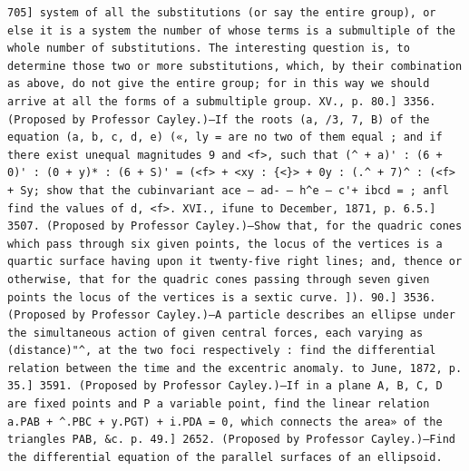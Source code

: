 \documentclass[11pt,a4paper]{book}
\begin{document}
\newpage
\setcounter{page}{575}
\begin{verbatim}
705] system of all the substitutions (or say the entire group), or else it is a system the number of whose terms is a submultiple of the whole number of substitutions. The interesting question is, to determine those two or more substitutions, which, by their combination as above, do not give the entire group; for in this way we should arrive at all the forms of a submultiple group. XV., p. 80.] 3356. (Proposed by Professor Cayley.)—If the roots (a, /3, 7, B) of the equation (a, b, c, d, e) («, ly = are no two of them equal ; and if there exist unequal magnitudes 9 and <f>, such that (^ + a)' : (6 + 0)' : (0 + y)* : (6 + S)' = (<f> + <xy : {<}> + 0y : (.^ + 7)^ : (<f> + Sy; show that the cubinvariant ace — ad- — h^e — c'+ ibcd = ; anfl find the values of d, <f>. XVI., ifune to December, 1871, p. 6.5.] 3507. (Proposed by Professor Cayley.)—Show that, for the quadric cones which pass through six given points, the locus of the vertices is a quartic surface having upon it twenty-five right lines; and, thence or otherwise, that for the quadric cones passing through seven given points the locus of the vertices is a sextic curve. ]). 90.] 3536. (Proposed by Professor Cayley.)—A particle describes an ellipse under the simultaneous action of given central forces, each varying as (distance)"^, at the two foci respectively : find the differential relation between the time and the excentric anomaly. to June, 1872, p. 35.] 3591. (Proposed by Professor Cayley.)—If in a plane A, B, C, D are fixed points and P a variable point, find the linear relation a.PAB + ^.PBC + y.PGT) + i.PDA = 0, which connects the area» of the triangles PAB, &c. p. 49.] 2652. (Proposed by Professor Cayley.)—Find the differential equation of the parallel surfaces of an ellipsoid. 
\end{verbatim}
\end{document}
